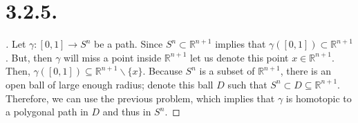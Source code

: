\documentclass{article}
\begin{document}
\section*{3.2.5.}
\begin{proof}[\unskip\nopunct]

    Let $\gamma:[0, 1] \to S^n$ be a path. Since $S^n \subset \mathbb{R}^{n + 1}$ implies that $\gamma([0, 1]) \subset \mathbb{R}^{n + 1}$. But, then $\gamma$ will miss a point inside $\mathbb{R}^{n + 1}$ let us denote this point $x \in \mathbb{R}^{n + 1}$. Then, $\gamma([0, 1]) \subseteq \mathbb{R}^{n + 1}\backslash \{x\}$. Because $S^n$ is a subset of $\mathbb{R}^{n + 1}$, there is an open ball of large enough radius; denote this ball $D$ such that $S^n \subset D \subseteq \mathbb{R}^{n + 1}$. Therefore, we can use the previous problem, which implies that $\gamma$ is homotopic to a polygonal path in $D$ and thus in $S^n$. 

\end{proof}
\end{document}
